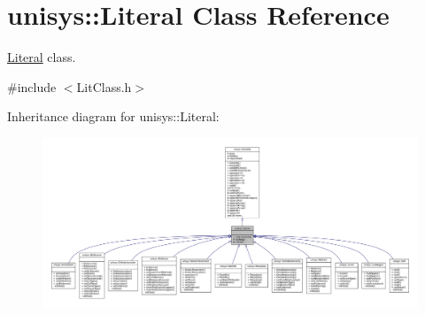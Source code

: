 \hypertarget{classunisys_1_1Literal}{\section{unisys\-:\-:Literal Class Reference}
\label{classunisys_1_1Literal}
}


\hyperlink{classunisys_1_1Literal}{Literal} class.  




{\ttfamily \#include $<$Lit\-Class.\-h$>$}



Inheritance diagram for unisys\-:\-:Literal\-:
\nopagebreak
\begin{figure}[H]
\begin{center}
\leavevmode
\includegraphics[width=350pt]{classunisys_1_1Literal__inherit__graph}
\end{center}
\end{figure}


